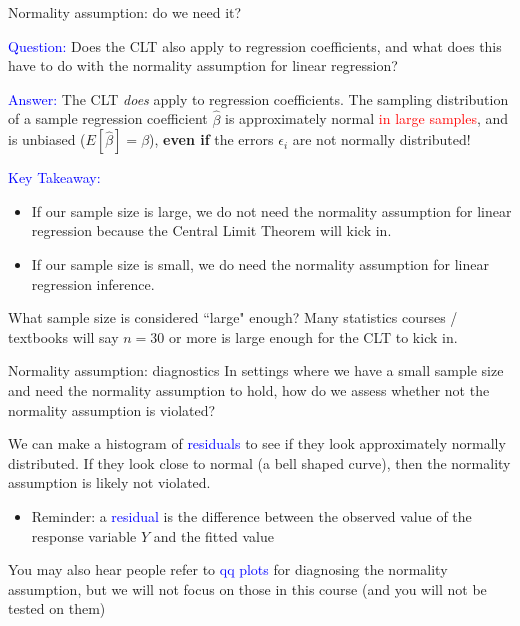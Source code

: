 \documentclass[10pt,t]{beamer}
\begin{document}
\begin{frame}{Normality assumption: do we need it?}
	\vspace{-5 mm}

\textcolor{blue}{Question:} Does the CLT also apply to regression coefficients, and what does this have to do with the normality assumption for linear regression?

\vspace{0.3cm} 

\textcolor{blue}{Answer:} The CLT \textit{does} apply to regression coefficients. The sampling distribution of a sample regression coefficient $\hat{\beta}$ is approximately normal \textcolor{red}{in large samples}, and is unbiased ($E[\hat{\beta}] = \beta$), \textbf{even if} the errors $\epsilon_i$ are not normally distributed! \pause

\vspace{0.3cm} 

\textcolor{blue}{Key Takeaway:} 
\begin{itemize}
	\item If our sample size is large, we do not need the normality assumption for linear regression because the Central Limit Theorem will kick in.
	\smallskip
	
	\item If our sample size is small, we do need the normality assumption for linear regression inference.
\end{itemize}

\small What sample size is considered ``large" enough? Many statistics courses / textbooks will say $n = 30$ or more is large enough for the CLT to kick in. 

\end{frame}

\begin{frame}{Normality assumption: diagnostics}
In settings where we have a small sample size and need the normality assumption to hold, how do we assess whether not the normality assumption is violated?

\vspace{0.3cm}

We can make a histogram of \textcolor{blue}{residuals} to see if they look approximately normally distributed. If they look close to normal (a bell shaped curve), then the normality assumption is likely not violated.

\vspace{0.3cm}

\begin{itemize}
	\item[] Reminder: a \textcolor{blue}{residual} is the difference between the observed value of the response variable $Y$ and the fitted value 
\end{itemize}

\vspace{0.3cm}

\small You may also hear people refer to \textcolor{blue}{qq plots} for diagnosing the normality assumption, but we will not focus on those in this course (and you will not be tested on them)

\end{frame}
\end{document}

